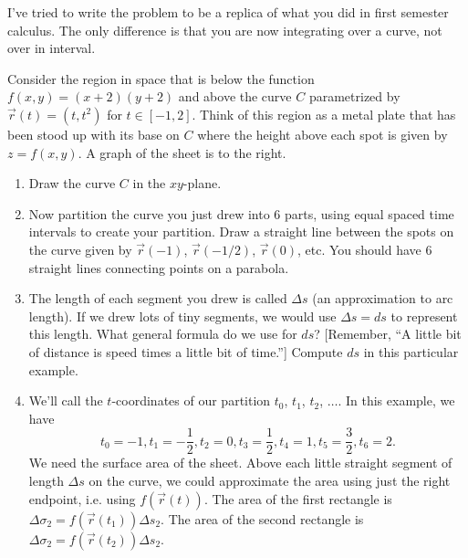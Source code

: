 I've tried to write the problem to be a replica of what you did in first semester calculus.  The only difference is that you are now integrating over a curve, not over in interval. 

%
\begin{problem}%
%
 Consider the region in space that is below the function 
$f(x,y)=(x+2)(y+2)$ and above the curve $C$ parametrized by 
$\vec r(t)=(t,t^2)$ for $t\in[-1,2]$.  Think of this region as a metal plate that has been stood up with its base on $C$ where the height above each spot is given by $z=f(x,y)$. A graph of the sheet is to the right.
\begin{enumerate}
 \item Draw the curve $C$ in the $xy$-plane.
 \item Now partition the curve you just drew into 6 parts, using equal spaced time intervals to create your partition. Draw a straight line between the spots on the curve given by $\vec r(-1)$, $\vec r(-1/2)$, $\vec r(0)$, etc.  You should have 6 straight lines connecting points on a parabola.
 \item The length of each segment you drew is called $\Delta s$ (an approximation to arc length). If we drew lots of tiny segments, we would use $\Delta s=ds$ to represent this length.  What general formula do we use for $ds$? [Remember, ``A little bit of distance is speed times a little bit of time.''] Compute $ds$ in this particular example.
 \item We'll call the $t$-coordinates of our partition $t_0$, $t_1$, $t_2$, $\ldots$. In this example, we have 
$$
t_0=-1, 
t_1=-\frac{1}{2}, 
t_2=0, 
t_3=\frac{1}{2}, 
t_4=1, 
t_5=\frac{3}{2}, 
t_6=2.
$$
We need the surface area of the sheet. Above each little straight segment of length $\Delta s$ on the curve, we could approximate the area using just the right endpoint, i.e. using $f(\vec r(t))$. 
The area of the first rectangle is  
$\Delta \sigma_2=f(\vec r(t_1))\Delta s_2$. The area of the second rectangle is $\Delta \sigma_2=f(\vec r(t_2))\Delta s_2$. 


\end{enumerate}
\end{problem}
